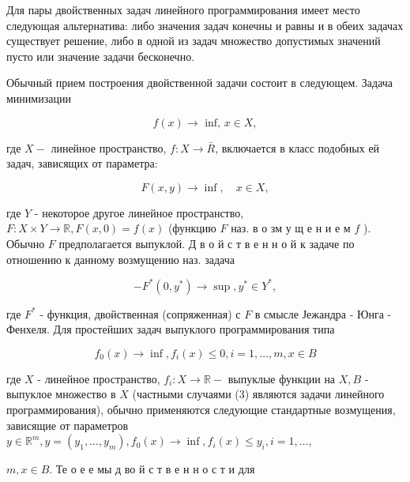 \documentclass[10pt]{article}
\begin{document}
Для пары двойственных задач линейного программирования имеет место следующая альтернатива: либо значения задач конечны и равны и в обеих задачах существует решение, либо в одной из задач множество допустимых значений пусто или значение задачи бесконечно.



Обычный прием построения двойственной задачи состоит в следующем. Задача минимизации



\[

f(x) \longrightarrow \text { inf, } x \in X,

\]



где $X-$ линейное пространство, $f: X \rightarrow \bar{R}$, включается в класс подобных ей задач, зависящих от параметра:



\[

F(x, y) \longrightarrow \inf , \quad x \in X,

\]



где $Y$ - некоторое другое линейное пространство, $F: X \times Y \rightarrow \mathbb{R}, F(x, 0)=f(x)$ (функцию $F$ наз. в о зм у щ е н и е м $f$ ). Обычно $F$ предполагается выпуклой. Д в о й с т в е н н о й к задаче по отношению к данному возмущению наз. задача



\[

-F^{*}\left(0, y^{*}\right) \longrightarrow \sup , y^{*} \in Y^{*},

\]



где $F^{*}$ - функция, двойственная (сопряженная) с $F$ в смысле Јежандра - Юнга - Фенхеля. Для простейших задач выпуклого программирования типа



\[

f_{0}(x) \longrightarrow \inf , f_{i}(x) \leqslant 0, i=1, \ldots, m, x \in B

\]



где $X$ - линейное пространство, $f_{i}: X \rightarrow \mathbb{R}-$ выпуклые функции на $X, B$ - выпуклое множество в $X$ (частными случаями (3) являются задачи линейного программирования), обычно применяются следующие стандартные возмущения, зависящие от параметров $y \in \mathbb{R}^{m}, y=\left(y_{1}, \ldots, y_{m}\right), f_{0}(x) \rightarrow \inf , f_{i}(x) \leqslant y_{i}, i=1, \ldots$,

$m, x \in B$. Те о е е мы д во й с т в е н н о с т и для
\end{document}
